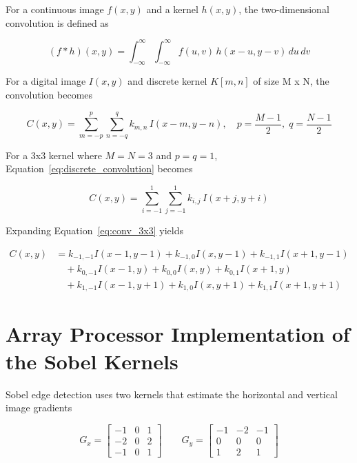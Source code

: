 \begin{uomappendix}
    For a continuous image $f(x,y)$ and a kernel $h(x,y)$, the 
    two-dimensional convolution is defined as
    
    \begin{equation}
    (f * h)(x,y) =
    \int_{-\infty}^{\infty}
    \int_{-\infty}^{\infty}
    f(u,v)\,h(x-u,y-v)\,du\,dv
    \label{eq:continuous_convolution}
    \end{equation}
    
    For a digital image $I(x,y)$ and discrete kernel $K[m,n]$ of size 
    M x N, the convolution becomes
    
    \begin{equation}
    C(x,y)=
    \sum_{m=-p}^{p}
    \sum_{n=-q}^{q}
    k_{m,n}\,I(x-m,y-n),
    \quad
    p=\frac{M-1}{2},\;
    q=\frac{N-1}{2}
    \label{eq:discrete_convolution}
    \end{equation}
    
    For a 3x3 kernel where $M=N=3$ and $p=q=1$, 
    Equation~\eqref{eq:discrete_convolution} becomes
    
    \begin{equation}
    C(x,y)=
    \sum_{i=-1}^{1}
    \sum_{j=-1}^{1}
    k_{i,j}\,I(x+j,y+i)
    \label{eq:conv_3x3}
    \end{equation}
    
    Expanding Equation~\eqref{eq:conv_3x3} yields
    
    \begin{equation}
    \begin{aligned}
    C(x,y) &= k_{-1,-1}I(x-1,y-1)
    + k_{-1,0}I(x,y-1)
    + k_{-1,1}I(x+1,y-1) \\
    &\quad + k_{0,-1}I(x-1,y)
    + k_{0,0}I(x,y)
    + k_{0,1}I(x+1,y) \\
    &\quad + k_{1,-1}I(x-1,y+1)
    + k_{1,0}I(x,y+1)
    + k_{1,1}I(x+1,y+1)
    \end{aligned}
    \label{eq:conv_expanded}
    \end{equation}
    
    
    \section{Array Processor Implementation of the Sobel Kernels}
    \label{app:sobel_derivation}
    
    Sobel edge detection uses two kernels that estimate the horizontal 
    and vertical image gradients
    
    \begin{equation}
    G_x =
    \begin{bmatrix}
    -1 & 0 & 1\\
    -2 & 0 & 2\\
    -1 & 0 & 1
    \end{bmatrix}
    \qquad
    G_y =
    \begin{bmatrix}
    -1 & -2 & -1\\
    0 & 0 & 0\\
    1 & 2 & 1
    \end{bmatrix}
    \label{eq:sobel_kernels}
    \end{equation}
    

\end{uomappendix}
